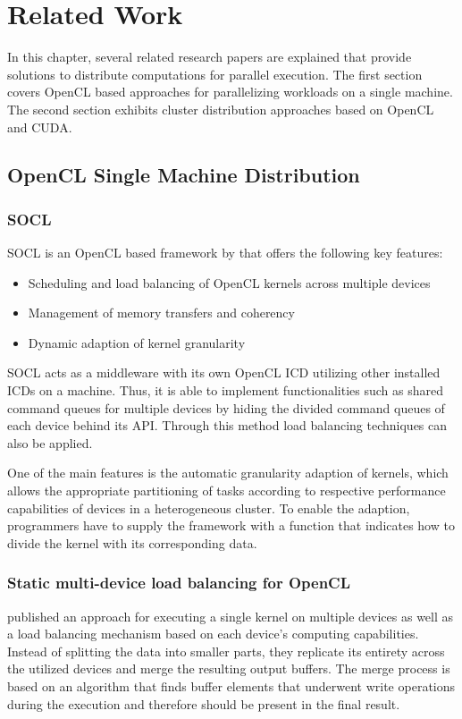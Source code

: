 \chapter{Related Work}
\label{related}
In this chapter, several related research papers are explained that provide solutions to distribute computations for parallel execution. The first section covers OpenCL based approaches for parallelizing workloads on a single machine. The second section exhibits cluster distribution approaches based on OpenCL and CUDA.

\section{OpenCL Single Machine Distribution}

\subsection*{SOCL}
SOCL is an OpenCL based framework by \citeauthor{socl} that offers the following key features\cite{socl}:
\begin{itemize}
    \item Scheduling and load balancing of OpenCL kernels across multiple devices
    \item Management of memory transfers and coherency
    \item Dynamic adaption of kernel granularity
\end{itemize}

SOCL acts as a middleware with its own OpenCL ICD utilizing other installed ICDs on a machine. Thus, it is able to implement functionalities such as shared command queues for multiple devices by hiding the divided command queues of each device behind its API. Through this method load balancing techniques can also be applied.

One of the main features is the automatic granularity adaption of kernels, which allows the appropriate partitioning of tasks according to respective performance capabilities of devices in a heterogeneous cluster. To enable the adaption, programmers have to supply the framework with a function that indicates how to divide the kernel with its corresponding data.

\subsection*{Static multi-device load balancing for OpenCL}
\citeauthor{delalama_2012} published an approach for executing a single kernel on multiple devices as well as a load balancing mechanism based on each device's computing capabilities\cite{delalama_2012}.
Instead of splitting the data into smaller parts, they replicate its entirety across the utilized devices and merge the resulting output buffers. The merge process is based on an algorithm that finds buffer elements that underwent write operations during the execution and therefore should be present in the final result.


